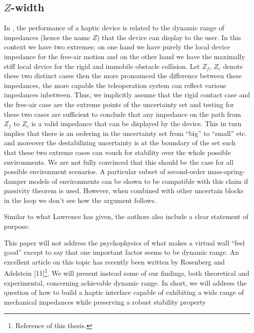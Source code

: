 \subsection{\texorpdfstring{$Z$}{Z}-width}

In \cite{colgate4}, the performance of a haptic device is related to the dynamic range of impedances (hence the name $Z$) that
the device can display to the user. In this context we have two extremes; on one hand we have purely the local device impedance 
for the free-air motion and on the other hand we have the maximally stiff local device for the rigid and immobile obstacle collision. 
Let $Z_f$, $Z_c$ denote these two distinct cases then the more pronounced the difference between these impedances, the more 
capable the teleoperation system can reflect various impedances inbetween. Thus, we implicitly assume that the rigid contact 
case and the free-air case are the extreme points of the uncertainty set and testing for these two cases are sufficient to 
conclude that any impedance on the path from $Z_f$ to $Z_c$ is a valid impedance that can be displayed by the device. This
in turn implies that there is an ordering in the uncertainty set from \enquote{big} to \enquote{small} etc. and moreover 
the destabilizing uncertainty is at the boundary of the set such that these two extreme cases can vouch for stability over 
the whole possible environments. We are not fully convinced that this should be the case for all possible environment 
scenarios. A particular subset of second-order mass-spring-damper models of environments can be shown to be compatible 
with this claim if passivity theorem is used. However, when combined with other uncertain blocks in the loop we don't see
how the argument follows.

Similar to what Lawrence has given, the authors also include a clear statement of purpose: 

\begin{displayquote}
This paper will not address the psychophysics of what
makes a virtual wall \enquote{feel good} except to say that one
important factor seems to be dynamic range. An excellent
article on this topic has recently been written by
Rosenberg and Adelstein [11]\footnote{Reference \cite{rosenberg} of this thesis.}. 
We will present instead
some of our findings, both theoretical and experimental,
concerning achievable dynamic range. In short, we will
address the question of how to build a haptic interface
capable of exhibiting a wide range of mechanical
impedances while preserving a robust stability property
\end{displayquote}


